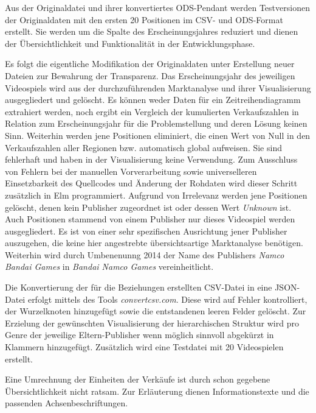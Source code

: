 \documentclass[usegeometry=true]{scrartcl}
\begin{document}
Aus der Originaldatei und ihrer konvertiertes ODS-Pendant werden Testversionen der Originaldaten mit den ersten 20 Positionen im CSV- und ODS-Format erstellt.
Sie werden um die Spalte des Erscheinungsjahres reduziert und dienen der Übersichtlichkeit und Funktionalität in der Entwicklungsphase.

Es folgt die eigentliche Modifikation der Originaldaten unter Erstellung neuer Dateien zur Bewahrung der Transparenz.
Das Erscheinungsjahr des jeweiligen Videospiels wird aus der durchzuführenden Marktanalyse und ihrer Visualisierung ausgegliedert und gelöscht. 
Es können weder Daten für ein Zeitreihendiagramm extrahiert werden, noch ergibt ein Vergleich der kumulierten Verkaufszahlen in Relation zum Erscheinungsjahr 
für die Problemstellung und deren Lösung keinen Sinn. 
Weiterhin werden jene Positionen eliminiert, die einen Wert von Null in den Verkaufszahlen aller Regionen bzw. automatisch global aufweisen. 
Sie sind fehlerhaft und haben in der Visualisierung keine Verwendung. 
Zum Ausschluss von Fehlern bei der manuellen Vorverarbeitung sowie universelleren Einsetzbarkeit des Quellcodes und Änderung der Rohdaten 
wird dieser Schritt zusätzlich in Elm programmiert.
Aufgrund von Irrelevanz werden jene Positionen gelöscht, denen kein Publisher zugeordnet ist oder dessen Wert \textit{Unknown} ist. 
Auch Positionen stammend von einem Publisher nur dieses Videospiel werden ausgegliedert.
Es ist von einer sehr spezifischen Ausrichtung jener Publisher auszugehen, die keine hier angestrebte übersichtsartige Marktanalyse benötigen.
Weiterhin wird durch Umbenenunng 2014 der Name des Publishers \textit{Namco Bandai Games} in \textit{Bandai Namco Games} vereinheitlicht.

Die Konvertierung der für die Beziehungen erstellten CSV-Datei in eine JSON-Datei erfolgt mittels des Tools \textit{convertcsv.com}.
Diese wird auf Fehler kontrolliert, der Wurzelknoten hinzugefügt sowie die entstandenen leeren Felder gelöscht. 
Zur Erzielung der gewünschten Visualisierung der hierarchischen Struktur wird pro Genre der jeweilige Eltern-Publisher wenn möglich sinnvoll abgekürzt in Klammern hinzugefügt. 
Zusätzlich wird eine Testdatei mit 20 Videospielen erstellt.

Eine Umrechnung der Einheiten der Verkäufe ist durch schon gegebene Übersichtlichkeit nicht ratsam. 
Zur Erläuterung dienen Informationstexte und die passenden Achsenbeschriftungen.
\end{document}
